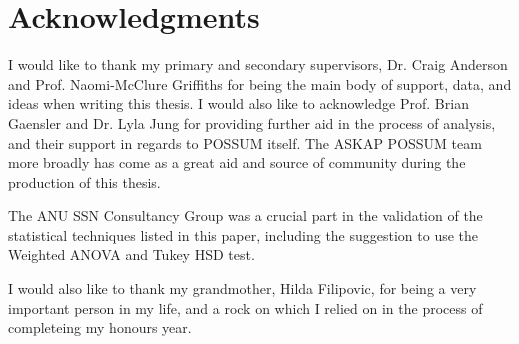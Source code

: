 \chapter*{Acknowledgments}


I would like to thank my primary and secondary supervisors, Dr. Craig Anderson and Prof. Naomi-McClure Griffiths for being the main body of support, data, and ideas when writing this thesis. I would also like to acknowledge Prof. Brian Gaensler and Dr. Lyla Jung for providing further aid in the process of analysis, and their support in regards to POSSUM itself. The ASKAP POSSUM team more broadly has come as a great aid and source of community during the production of this thesis.

The ANU SSN Consultancy Group was a crucial part in the validation of the statistical techniques listed in this paper, including the suggestion to use the Weighted ANOVA and Tukey HSD test.

I would also like to thank my grandmother, Hilda Filipovic, for being a very important person in my life, and a rock on which I relied on in the process of completeing my honours year.